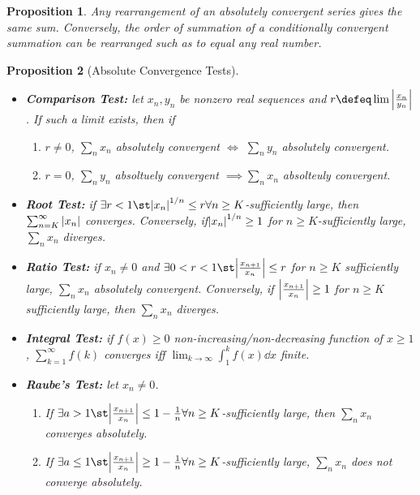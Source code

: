 \documentclass[12pt, oneside]{article}
\theoremstyle{definition}
\theoremstyle{plain}
\newtheorem{prop}{Proposition}
\theoremstyle{remark}
\begin{document}
\begin{prop}
  Any rearrangement of an absolutely convergent series gives the same sum. Conversely, the order of summation of a conditionally convergent summation can be rearranged such as to equal any real number.
\end{prop}


\begin{prop}[Absolute Convergence Tests]
  \begin{itemize}
    \item \textbf{Comparison Test:} let $x_n, y_n$ be nonzero real sequences and $r \defeq \lim \abs{\frac{x_n}{y_n}}$. If such a limit exists, then if
    \begin{enumerate}[label=(\alph*)]
      \item $r \neq 0$, $\sum_n x_n$ absolutely convergent $\iff$ $\sum_n y_n$ absolutely convergent.
      \item $r = 0$, $\sum_n {y_n}$ absoltuely convergent $\implies \sum_n x_n$ absolteuly convergent.
    \end{enumerate}
    \item \textbf{Root Test:} if $\exists r < 1 \st \abs{x_n}^{1/n} \leq r \forall n \geq K$-sufficiently large, then $\sum_{n=K}^\infty \abs{x_n}$ converges. Conversely, if$\abs{x_n}^{1/n} \geq 1$ for $n \geq K$-sufficiently large, $\sum_n x_n$ diverges.
    \item \textbf{Ratio Test:} if $x_n \neq 0$ and $\exists 0 < r < 1  \st \abs{\frac{x_{n+1}}{x_n}} \leq r$ for $n \geq K$ sufficiently large, $\sum_n x_n$ absolutely convergent. Conversely, if $\abs{\frac{x_{n+1}}{x_n}} \geq 1$ for $n \geq K$ sufficiently large, then $\sum_n x_n$ diverges.
    \item \textbf{Integral Test:} if $f(x) \geq 0$ non-increasing/non-decreasing function of $x \geq 1$, $\sum_{k=1}^\infty f(k)$ converges iff $\lim_{k \to \infty} \int_1^k f(x) \dd{x}$ finite.
    \item[$\ast$] \textbf{Raube's Test:} let $x_n \neq 0$. \begin{enumerate}[label=(\alph*)]
      \item If $\exists a > 1 \st \abs{\frac{x_{n+1}}{x_n}} \leq 1 - \frac{1}{n} \forall n \geq K$-sufficiently large, then $\sum_{n} x_n$ converges absolutely.
      \item If $\exists a \leq 1 \st \abs{\frac{x_{n+1}}{x_n}} \geq 1 - \frac{1}{n} \forall n \geq K$-sufficiently large, $\sum_{n} x_n$ does not converge absolutely.
    \end{enumerate}
  \end{itemize}
\end{prop}
\end{document}
